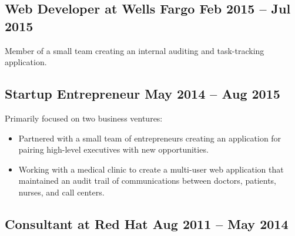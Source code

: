 \documentclass[12pt]{article}
\begin{document}
     
 

\subsection*{Web Developer at Wells Fargo \hfill Feb 2015 -- Jul 2015}

Member of a small team creating an internal auditing and task-tracking
application.

    

\subsection*{Startup Entrepreneur \hfill May 2014 -- Aug 2015}

Primarily focused on two business ventures:

\begin{itemize}
  \item Partnered with a small team of entrepreneurs creating an application for
    pairing high-level executives with new opportunities.

  \item Working with a medical clinic to create a multi-user web application
    that maintained an audit trail of communications between doctors, patients,
    nurses, and call centers.
\end{itemize}

     
\tag{\LaTeX}

\subsection*{Consultant at Red Hat \hfill Aug 2011 -- May 2014}
\end{document}
